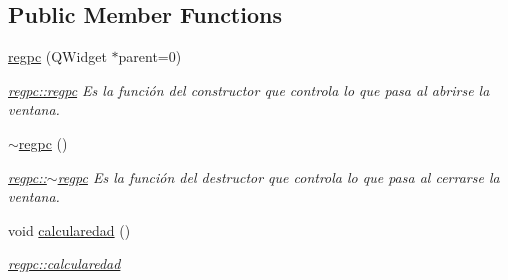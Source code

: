 \subsection*{Public Member Functions}
\begin{DoxyCompactItemize}
\item 
\hyperlink{classregpc_a0e746dd80042db7863f1acc0eceb3e0e}{regpc} (Q\+Widget $\ast$parent=0)
\begin{DoxyCompactList}\small\item\em \hyperlink{classregpc_a0e746dd80042db7863f1acc0eceb3e0e}{regpc\+::regpc} Es la función del constructor que controla lo que pasa al abrirse la ventana. \end{DoxyCompactList}\item 
\hyperlink{classregpc_a44345c70fea1c353bde3cd00e4a05c1d}{$\sim$regpc} ()
\begin{DoxyCompactList}\small\item\em \hyperlink{classregpc_a44345c70fea1c353bde3cd00e4a05c1d}{regpc\+::$\sim$regpc} Es la función del destructor que controla lo que pasa al cerrarse la ventana. \end{DoxyCompactList}\item 
void \hyperlink{classregpc_a4c2805dbeac86a39d8afd591c7f14ec9}{calcularedad} ()
\begin{DoxyCompactList}\small\item\em \hyperlink{classregpc_a4c2805dbeac86a39d8afd591c7f14ec9}{regpc\+::calcularedad} \end{DoxyCompactList}\end{DoxyCompactItemize}
